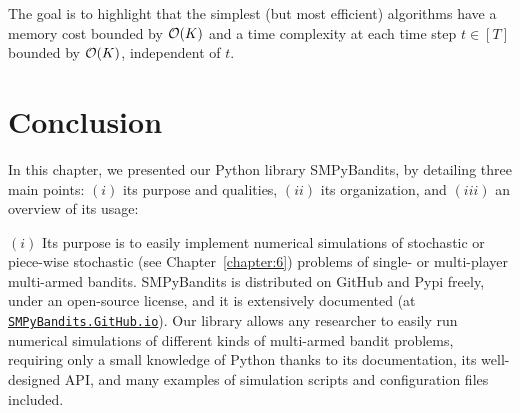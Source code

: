 The goal is to highlight that the simplest (but most efficient) algorithms have a memory cost bounded by $\mathop{}\mathopen{}\mathcal{O}\mathopen{}\left(K\right)$ and a time complexity at each time step $t\in[T]$ bounded by $\mathop{}\mathopen{}\mathcal{O}\mathopen{}\left(K\right)$, independent of $t$.









\newpage  %
\section{Conclusion}
\label{sec:3:conclusion}


In this chapter, we presented our Python library SMPyBandits, by detailing three main points:
$(i)$ its purpose and qualities,
$(ii)$ its organization,
and $(iii)$ an overview of its usage:
%

$(i)$
Its purpose is to easily implement numerical simulations of stochastic or piece-wise stochastic (see Chapter~\ref{chapter:6}) problems of single- or multi-player multi-armed bandits.
SMPyBandits is distributed on GitHub and Pypi freely, under an open-source license, and it is extensively documented (at \href{https://SMPyBandits.GitHub.io}{\texttt{SMPyBandits.GitHub.io}}).
Our library allows any researcher to easily run numerical simulations of different kinds of multi-armed bandit problems, requiring only a small knowledge of Python thanks to its documentation, its well-designed API, and many examples of simulation scripts and configuration files included.

